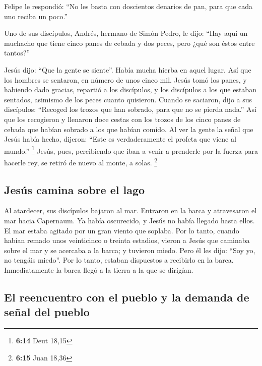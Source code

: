  Felipe le respondió: ``No les basta con doscientos
denarios de pan, para que cada uno reciba un poco.''

 Uno de sus discípulos, Andrés, hermano de Simón Pedro, le
dijo:  ``Hay aquí un muchacho que tiene cinco panes de
cebada y dos peces, pero ¿qué son éstos entre tantos?''

 Jesús dijo: ``Que la gente se siente''. Había mucha
hierba en aquel lugar. Así que los hombres se sentaron, en número de
unos cinco mil.  Jesús tomó los panes, y habiendo dado
gracias, repartió a los discípulos, y los discípulos a los que estaban
sentados, asimismo de los peces cuanto quisieron.  Cuando
se saciaron, dijo a sus discípulos: ``Recoged los trozos que han
sobrado, para que no se pierda nada.''  Así que los
recogieron y llenaron doce cestas con los trozos de los cinco panes de
cebada que habían sobrado a los que habían comido.  Al
ver la gente la señal que Jesús había hecho, dijeron: ``Este es
verdaderamente el profeta que viene al mundo.'' \footnote{\textbf{6:14}
  Deut 18,15}  Jesús, pues, percibiendo que iban a venir
a prenderle por la fuerza para hacerle rey, se retiró de nuevo al monte,
a solas. \footnote{\textbf{6:15} Juan 18,36}

\hypertarget{jesuxfas-camina-sobre-el-lago}{%
\subsection{Jesús camina sobre el
lago}\label{jesuxfas-camina-sobre-el-lago}}

 Al atardecer, sus discípulos bajaron al mar.
 Entraron en la barca y atravesaron el mar hacia
Capernaum. Ya había oscurecido, y Jesús no había llegado hasta ellos.
 El mar estaba agitado por un gran viento que soplaba.
 Por lo tanto, cuando habían remado unos veinticinco o
treinta estadios, vieron a Jesús que caminaba sobre el mar y se acercaba
a la barca; y tuvieron miedo.  Pero él les dijo: ``Soy
yo, no tengáis miedo''.  Por lo tanto, estaban dispuestos
a recibirlo en la barca. Inmediatamente la barca llegó a la tierra a la
que se dirigían.

\hypertarget{el-reencuentro-con-el-pueblo-y-la-demanda-de-seuxf1al-del-pueblo}{%
\subsection{El reencuentro con el pueblo y la demanda de señal del
pueblo}\label{el-reencuentro-con-el-pueblo-y-la-demanda-de-seuxf1al-del-pueblo}}

